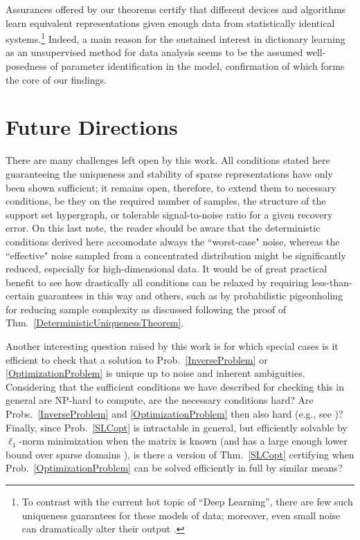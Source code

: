 Assurances offered by our theorems certify that different devices and algorithms learn equivalent representations given enough data from statistically identical systems.\footnote{To contrast with the current hot topic of ``Deep Learning'', there are few such uniqueness guarantees for these models of data; moreover, even small noise can dramatically alter their output \cite{goodfellow2014explaining}.} 
Indeed, a main reason for the sustained interest in dictionary learning as an unsupervised method for data analysis seems to be the assumed well-posedness of parameter identification in the model, confirmation of which forms the core of our findings.

\section{Future Directions}

There are many challenges left open by this work. All conditions stated here guaranteeing the uniqueness and stability of sparse representations have only been shown sufficient; it remains open, therefore, to extend them to necessary conditions, be they on the required number of samples, the structure of the support set hypergraph, or tolerable signal-to-noise ratio for a given recovery error. On this last note, the reader should be aware that the deterministic conditions derived here accomodate always the ``worst-case" noise, whereas the ``effective" noise sampled from a concentrated distribution might be significantly reduced, especially for high-dimensional data. It would be of great practical benefit to see how drastically all conditions can be relaxed by requiring less-than-certain guarantees in this way and others, such as by probabilistic pigeonholing for reducing sample complexity as discussed following the proof of Thm.~\ref{DeterministicUniquenessTheorem}.

Another interesting question raised by this work is for which special cases is it efficient to check that a solution to Prob.~\ref{InverseProblem} or \ref{OptimizationProblem} is unique up to noise and inherent ambiguities. Considering that the sufficient conditions we have described for checking this in general are NP-hard to compute, are the necessary conditions hard? Are Probs.~\ref{InverseProblem} and \ref{OptimizationProblem} then also hard (e.g., see \cite{Tillmann15})? Finally, since Prob.~\ref{SLCopt} is intractable in general, but efficiently solvable by $\ell_1$-norm minimization when the matrix is known (and has a large enough lower bound over sparse domains \cite{eldar2012compressed}), is there a version of Thm.~\ref{SLCopt} certifying when Prob.~\ref{OptimizationProblem} can be solved efficiently in full by similar means?  %

